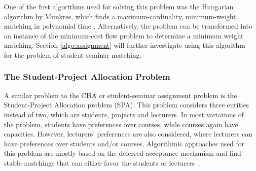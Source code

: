 One of the first algorithms used for solving this problem was the Hungarian algorithm by Munkres, which finds a maximum-cardinality, minimum-weight matching in polynomial time \cite{Munkres}. 
Alternatively, the problem can be transformed into an instance of the minimum-cost flow problem to determine a minimum weight matching. Section \ref{algo:assignment} will further investigate using this algorithm for the problem of student-seminar matching.

\subsubsection{The Student-Project Allocation Problem}
A similar problem to the CHA or student-seminar assignment problem is the Student-Project Allocation problem (SPA). This problem considers three entities instead of two, which are students, projects and lecturers. In most variations of the problem, students have preferences over courses, while courses again have capacities. However, lecturers' preferences are also considered, where lecturers can have preferences over students and/or courses. Algorithmic approaches used for this problem are mostly based on the deferred acceptance mechanism and find stable matchings that can either favor the students or lecturers \cite{algorithmics}. 